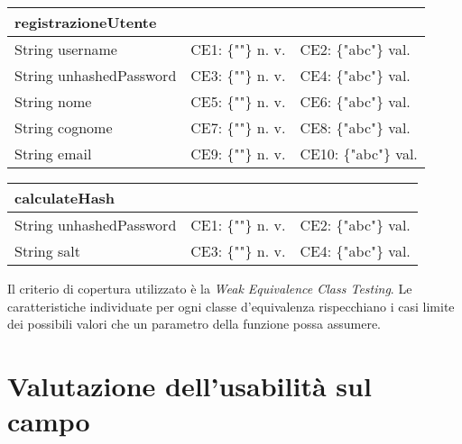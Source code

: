 \begin{table}[H]
\begin{tabular}{|l|l|l|}
\hline
\textbf{registrazioneUtente}     &                           &                         \\ \hline
String username         & CE1: \{""\} n. v.       & CE2: \{"abc"\} val.     \\ \hline
String unhashedPassword & CE3: \{""\} n. v. & CE4: \{"abc"\} val. \\ \hline
String nome             & CE5: \{""\} n. v.         & CE6: \{"abc"\} val.     \\ \hline
String cognome          & CE7: \{""\} n. v.         & CE8: \{"abc"\} val.     \\ \hline
String email            & CE9: \{""\} n. v.         & CE10: \{"abc"\} val.    \\ \hline
\end{tabular}
\end{table}
\begin{table}[H]
\begin{tabular}{|l|l|l|}
\hline
\textbf{calculateHash}  &                           &                         \\ \hline
String unhashedPassword & CE1: \{""\} n. v.       &  CE2: \{"abc"\} val.                       \\ \hline
String salt    & CE3: \{""\} n. v. & CE4: \{"abc"\} val. \\ \hline
\end{tabular}
\end{table}
Il criterio di copertura utilizzato è la \textit{\gls{Weak Equivalence Class Testing}}.
Le caratteristiche individuate per ogni classe d'equivalenza rispecchiano i casi limite dei possibili valori che un parametro della funzione possa assumere.  

\raggedright{\section{Valutazione dell'usabilità sul campo}}

